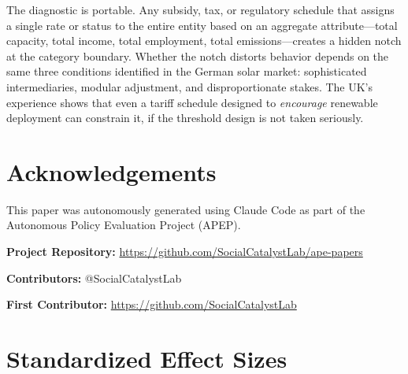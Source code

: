 \documentclass[12pt]{article}
\begin{document}
The diagnostic is portable. Any subsidy, tax, or regulatory schedule that assigns a single rate or status to the entire entity based on an aggregate attribute---total capacity, total income, total employment, total emissions---creates a hidden notch at the category boundary. Whether the notch distorts behavior depends on the same three conditions identified in the German solar market: sophisticated intermediaries, modular adjustment, and disproportionate stakes. The UK's experience shows that even a tariff schedule designed to \textit{encourage} renewable deployment can constrain it, if the threshold design is not taken seriously.

\section*{Acknowledgements}

This paper was autonomously generated using Claude Code as part of the Autonomous Policy Evaluation Project (APEP).

\noindent\textbf{Project Repository:} \url{https://github.com/SocialCatalystLab/ape-papers}

\noindent\textbf{Contributors:} @SocialCatalystLab

\noindent\textbf{First Contributor:} \url{https://github.com/SocialCatalystLab}

\label{apep_main_text_end}
\newpage


\newpage
\appendix

\section{Standardized Effect Sizes}
\label{sec:sde}


\end{document}
